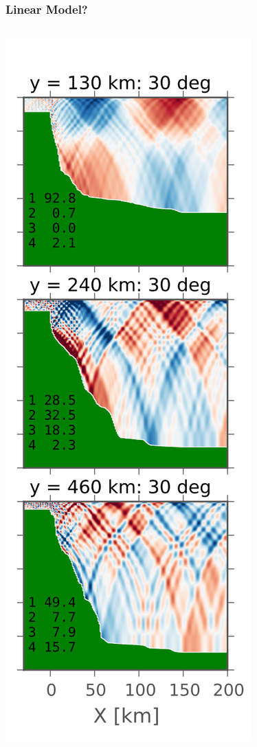 \documentclass[aspectratio=169]{beamer}
\begin{document}
\begin{frame}
  \frametitle{Linear Model?}
  \begin{columns}
    \begin{column}{0.2\textwidth}
      \includegraphics[width=\textwidth]{doc/MyKelly.png}  
      

\end{column}
\end{columns}
\end{frame}
\end{document}
